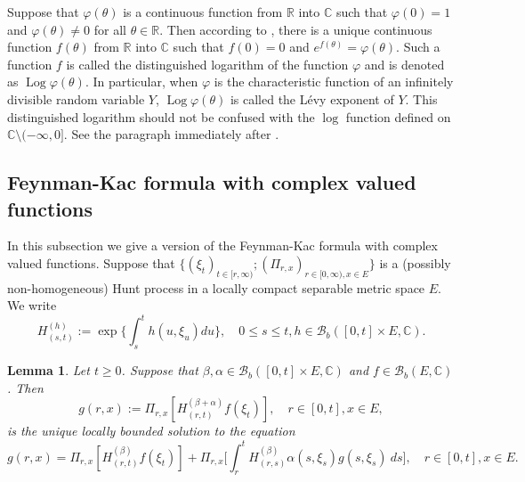 \documentclass[UTF8]{pkuthss}
\theoremstyle{plain}
\newtheorem{lem}[thm]{Lemma}
\theoremstyle{definition}
\numberwithin{equation}{section}
\begin{document}
    Suppose that $\varphi(\theta)$ is a continuous function from $\mathbb R$ into $\mathbb C$ such that $\varphi(0) = 1$ and $\varphi(\theta) \neq 0$ for all $\theta \in \mathbb R$.
    Then according to \cite[Lemma 7.6]{Sato2013Levy}, there is a unique continuous function $f(\theta)$ from $\mathbb R$ into $\mathbb C$ such that $f(0) = 0$ and $e^{f(\theta)} = \varphi(\theta)$.
    Such a function $f$ is called the distinguished logarithm of the function $\varphi$ and is denoted as $\operatorname{Log} \varphi(\theta)$.
    In particular, when $\varphi$ is the characteristic function of an infinitely divisible random variable $Y$,  $\operatorname{Log} \varphi(\theta)$ is called the L\'evy exponent of $Y$.
    This distinguished logarithm should not be confused with the $\log$ function defined on $\mathbb C\setminus (-\infty, 0]$.
    See the paragraph immediately after \cite[Lemma 7.6]{Sato2013Levy}.

\subsection{Feynman-Kac formula with complex valued functions}
\label{seq: complex Feynman-Kac transform}
    In this subsection we give a version of the Feynman-Kac formula with complex valued functions.
    Suppose that $\{(\xi_t)_{t \in [r,\infty)}; (\Pi_{r,x})_{r\in [0,\infty), x\in E}\}$ is a (possibly non-homogeneous) Hunt process in a locally compact separable metric space $E$.
    We write
\begin{equation}
    H^{(h)}_{(s,t)}
    := \exp\Big\{\int_s^t h(u,\xi_u) du\Big\},
    \quad 0 \leq s \leq t, h \in \mathcal B_b([0,t] \times E,\mathbb C).
\end{equation}

\begin{lem}
\label{eq: complex FK}
    Let $t \geq 0$. Suppose that
    $\beta, \alpha\in \mathcal B_b([0,t] \times E, \mathbb C)$
    and $f\in \mathcal B_b(E, \mathbb C)$.
    Then
\begin{equation}
\label{eq: expresion of g}
    g(r,x) := \Pi_{r,x}[ H_{(r,t)}^{(\beta+\alpha)} f(\xi_t)],\quad r \in [0,t], x\in E,
\end{equation}
    is the unique locally bounded solution to the equation
\[
    g(r,x)= \Pi_{r,x} [ H_{(r,t)}^{(\beta)} f(\xi_t)]+\Pi_{r,x} \Big[ \int_r^tH_{(r,s)}^{(\beta)}\alpha(s,\xi_s) g(s,\xi_s)~ds \Big],\quad r \in [0,t], x\in E.
\]
\end{lem}
\end{document}
